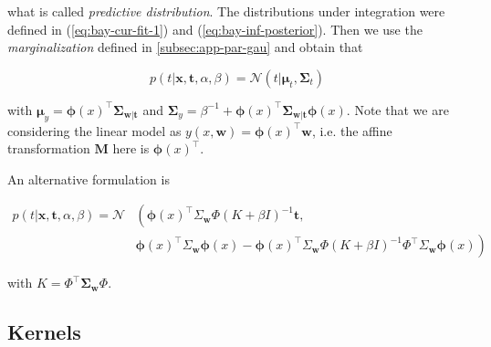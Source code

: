 \documentclass[11pt]{article} %
\begin{document}
what is called \textit{predictive distribution}. The distributions under integration were defined in (\ref{eq:bay-cur-fit-1}) and (\ref{eq:bay-inf-posterior}). Then we use the \textit{marginalization} defined in \autoref{subsec:app-par-gau} and obtain that

\begin{equation}
   p(t | \mathbf{x}, \mathbf{t}, \alpha, \beta)=\mathcal{N}\left(t | \boldsymbol{\mu}_{t}, \boldsymbol{\Sigma}_{t} \right)
\end{equation}

with $\boldsymbol{\mu}_y = \boldsymbol{\phi}(x)^\top \boldsymbol{\Sigma}_{\mathbf{w} | \mathbf{t}}$ and $\boldsymbol{\Sigma}_y = \beta^{-1} + \boldsymbol{\phi}(x)^\top \boldsymbol{\Sigma}_{\mathbf{w} | \mathbf{t}}\boldsymbol{\phi}(x)$. Note that we are considering the linear model as $y(x,\mathbf{w}) = \boldsymbol{\phi}(x)^\top \mathbf{w}$, i.e. the affine transformation $\mathbf{M}$ here is $\boldsymbol{\phi}(x)^\top$.

An alternative formulation \cite{Rasmussen:2005:GPM:1162254} is

\begin{equation}
\begin{aligned}
      p(t | \mathbf{x}, \mathbf{t}, \alpha, \beta) = \mathcal{N} & \left(  \boldsymbol{\phi}(x)^{\top} \Sigma_\mathbf{w} \Phi\left(K+\beta I\right)^{-1} \mathbf{t} \right., \\ &\left.\boldsymbol{\phi}(x)^{\top} \Sigma_\mathbf{w} \boldsymbol{\phi}(x)-\boldsymbol{\phi}(x)^{\top} \Sigma_\mathbf{w} \Phi\left(K+\beta I\right)^{-1} \Phi^{\top} \Sigma_\mathbf{w} \boldsymbol{\phi}(x)\right)
\end{aligned}
\end{equation}

with $K=\Phi^{\top} \boldsymbol{\Sigma}_\mathbf{w} \Phi$.

\subsection{Kernels}
\end{document}
